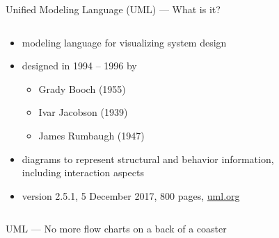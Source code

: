 \documentclass{beamer}
\begin{document}
\begin{frame}{Unified Modeling Language (UML) — What is it?}
\begin{columns}
\begin{column}{.6\textwidth}
\begin{itemize}
\item \alert{modeling language for visualizing system design}
\\\mbox{}
\item designed in 1994 – 1996 by
\begin{itemize}
\item Grady Booch (1955)
\item Ivar Jacobson (1939)
\item James Rumbaugh (1947)
\end{itemize}
\mbox{}
\item \alert{diagrams to represent structural and behavior information}, including interaction aspects
\\\mbox{}
\item version 2.5.1, 5 December 2017, 800 pages, \href{http://uml.org}{uml.org}
\end{itemize}
\end{column}
\begin{column}{.4\textwidth}
\begin{figure}
\def\centering\svgwidth{\columnwidth}
\resizebox{\columnwidth}{!}{}
\end{figure}
\end{column}
\end{columns}
\end{frame}

\begin{frame}{UML — No more flow charts on a back of a coaster}
\begin{figure}
\centering
{}
\end{figure}
\end{frame}
\end{document}
